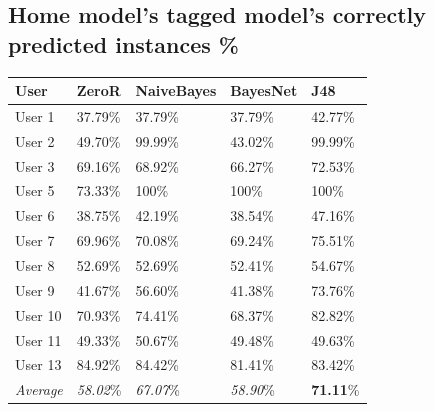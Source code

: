 \documentclass[prodmode,acmtecs]{acmsmall}
\begin{document}
\subsection{Home model's tagged model's correctly predicted instances \%}
\label{APX:individual-Home}
\begin{table}[htdp]
\begin{tabular}{lllll}
\hline
\textbf{User}      &\textbf{ZeroR}      & \textbf{NaiveBayes}      & \textbf{BayesNet}     & \textbf{J48}      \\ \hline
User 1  & 37.79\% & 37.79\% & 37.79\% & 42.77\% \\
User 2  & 49.70\% & 99.99\% & 43.02\% & 99.99\% \\
User 3  & 69.16\% & 68.92\% & 66.27\% & 72.53\% \\
User 5  & 73.33\% & 100\%   & 100\%   & 100\%   \\
User 6  & 38.75\% & 42.19\% & 38.54\% & 47.16\% \\
User 7  & 69.96\% & 70.08\% & 69.24\% & 75.51\% \\
User 8  & 52.69\% & 52.69\% & 52.41\% & 54.67\% \\
User 9  & 41.67\% & 56.60\% & 41.38\% & 73.76\% \\
User 10 & 70.93\% & 74.41\% & 68.37\% & 82.82\% \\
User 11 & 49.33\% & 50.67\% & 49.48\% & 49.63\% \\
User 13 & 84.92\% & 84.42\% & 81.41\% & 83.42\% \\ \hline 
\textit{Average} & \textit{58.02}\% & \textit{67.07}\% & \textit{58.90}\% & \textbf{71.11}\% \\ \hline 
\end{tabular}
\end{table}
\end{document}
